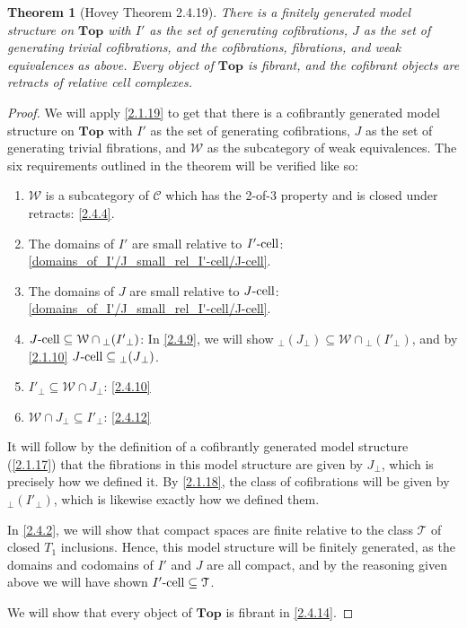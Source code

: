 \documentclass{amsart}
\theoremstyle{plain}
\newtheorem{theorem}{Theorem}[section]
\theoremstyle{definition}
\newcommand{\Top}{\mbf{Top}}
\newcommand{\sseq}{\subseteq}
\newcommand{\0}{\mathbf{0}}
\newcommand{\cC}{\mathcal C}
\newcommand{\p}{{_\perp}}
\newcommand{\cT}{\mathcal T}
\newcommand{\cW}{\mathcal W}
\newcommand{\mbf}[1]{\mathbf{#1}}
\renewcommand{\(}{\left(}
\renewcommand{\)}{\right)}
\newcommand{\cell}{\text-\mathrm{cell}}
\begin{document}
\begin{theorem}[Hovey Theorem 2.4.19]\label{2.4.19}
  There is a finitely generated model structure on $\Top$ with $I'$ as the set of generating cofibrations, $J$ as the set of generating trivial cofibrations, and the cofibrations, fibrations, and weak equivalences as above. Every object of $\Top$ is fibrant, and the cofibrant objects are retracts of relative cell complexes.
\end{theorem}
\begin{proof}
  We will apply \autoref{2.1.19} to get that there is a cofibrantly generated model structure on $\Top$ with $I'$ as the set of generating cofibrations, $J$ as the set of generating trivial fibrations, and $\cW$ as the subcategory of weak equivalences. The six requirements outlined in the theorem will be verified like so:
  \begin{enumerate}[label=\arabic*.,noitemsep,topsep=0pt]
    \item $\cW$ is a subcategory of $\cC$ which has the 2-of-3 property and is closed under retracts: \autoref{2.4.4}.
    \item The domains of $I'$ are small relative to $I'\cell$: \autoref{domains_of_I'/J_small_rel_I'-cell/J-cell}.
    \item The domains of $J$ are small relative to $J\cell$: \autoref{domains_of_I'/J_small_rel_I'-cell/J-cell}.
    \item $J\cell\sseq\cW\cap {\p( I'\p )}$: In \autoref{2.4.9}, we will show ${\p({J}\p)}\sseq\cW\cap {\p( I'\p )}$, and by \autoref{2.1.10} $J\cell\sseq {\p({J}\p)}$.
    \item $ I'\p \sseq\cW\cap J\p$: \autoref{2.4.10}
    \item $\cW\cap J\p\sseq  I'\p $: \autoref{2.4.12}
  \end{enumerate}
  It will follow by the definition of a cofibrantly generated model structure (\autoref{2.1.17}) that the fibrations in this model structure are given by $J\p$, which is precisely how we defined it. By \autoref{2.1.18}, the class of cofibrations will be given by ${\p( I'\p )}$, which is likewise exactly how we defined them.

  In \autoref{2.4.2}, we will show that compact spaces are finite relative to the class $\cT$ of closed $T_1$ inclusions. Hence, this model structure will be finitely generated, as the domains and codomains of $I'$ and $J$ are all compact, and by the reasoning given above we will have shown $I'\cell\sseq\cT$.
  
  We will show that every object of $\Top$ is fibrant in \autoref{2.4.14}. 
\end{proof}
\end{document}
